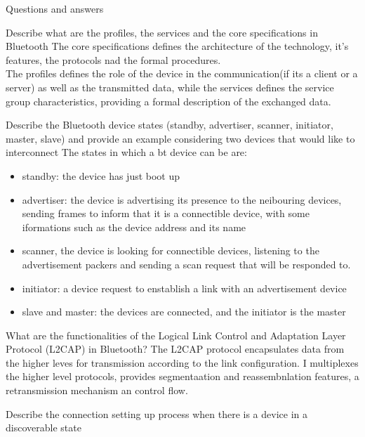 \begin{section}{Questions and answers}
  \begin{subsubsection}{Describe what are the profiles, the services and the core specifications in
    Bluetooth}
    The core specifications defines the architecture of the technology, it's features, the protocols
    nad the formal procedures.\\
    The profiles defines the role of the device in the communication(if its a client or a server) as
    well as the transmitted data, while the services defines the service group characteristics,
    providing a formal description of the exchanged data. 
  \end{subsubsection}
  \begin{subsubsection}{Describe the Bluetooth device states (standby, advertiser, scanner,
      initiator, master, slave) and provide an example considering two devices that would like to
    interconnect}
    The states in which a bt device can be are:
    \begin{itemize}
      \item standby: the device has just boot up 
      \item advertiser: the device is advertising its presence to the neibouring devices, sending
        frames to inform that it is a connectible device, with some iformations such as the device
        address and its name
      \item scanner, the device is looking for connectible devices, listening to the advertisement
        packers and sending a scan request that will be responded to.
      \item initiator: a device request to enstablish a link with an advertisement device 
      \item slave and master: the devices are connected, and the initiator is the master
    \end{itemize}
  \end{subsubsection}
  \begin{subsubsection}{What are the functionalities of the Logical Link Control and Adaptation
    Layer Protocol (L2CAP) in Bluetooth?}
    The L2CAP protocol encapsulates data from the higher leves for transmission according to the
    link configuration. I multiplexes the higher level protocols, provides segmentaation and
    reassembnlation features, a retransmission mechanism an control flow.
  \end{subsubsection}
  \begin{subsubsection}{Describe the connection setting up process when there is a device in a
    discoverable state}

\end{subsubsection}
\end{section}

